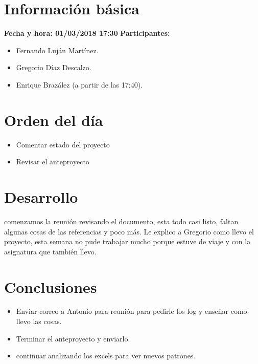 \documentclass[a4paper]{article}
\begin{document}
\section{Información básica}
\textbf{Fecha y hora: 01/03/2018 17:30}
\newline
\textbf{Participantes:}
\begin{itemize}
	\item Fernando Luján Martínez.
    \item Gregorio Díaz Descalzo.
    \item Enrique Brazález (a partir de las 17:40).
\end{itemize}
\section{Orden del día}
\begin{itemize}
\item Comentar estado del proyecto
\item Revisar el anteproyecto
\end{itemize}
\section{Desarrollo}
comenzamos la reunión revisando el documento, esta todo casi listo, faltan algunas cosas de las referencias y poco más.
Le explico a Gregorio como llevo el proyecto, esta semana no pude trabajar mucho porque estuve de viaje y con la asignatura que también llevo.
\section{Conclusiones}
\begin{itemize}
\item Enviar correo a Antonio para reunión para pedirle los log y enseñar como llevo las cosas.
\item Terminar el anteproyecto y enviarlo.
\item continuar analizando los excels para ver nuevos patrones.
\end{itemize}
\end{document}
